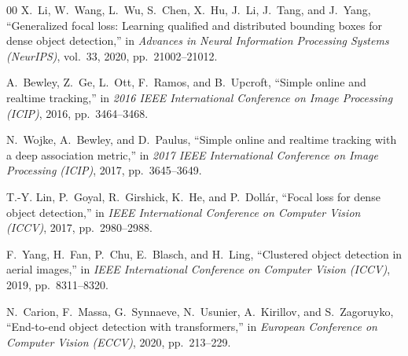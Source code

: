\documentclass[conference]{IEEEtran}
\begin{document}
\begin{thebibliography}{00}
X.~Li, W.~Wang, L.~Wu, S.~Chen, X.~Hu, J.~Li, J.~Tang, and J.~Yang, ``Generalized focal loss: Learning qualified and distributed bounding boxes for dense object detection,'' in \emph{Advances in Neural Information Processing Systems (NeurIPS)}, vol.~33, 2020, pp.~21002--21012.

A.~Bewley, Z.~Ge, L.~Ott, F.~Ramos, and B.~Upcroft, ``Simple online and realtime tracking,'' in \emph{2016 IEEE International Conference on Image Processing (ICIP)}, 2016, pp.~3464--3468.

N.~Wojke, A.~Bewley, and D.~Paulus, ``Simple online and realtime tracking with a deep association metric,'' in \emph{2017 IEEE International Conference on Image Processing (ICIP)}, 2017, pp.~3645--3649.

T.-Y. Lin, P.~Goyal, R.~Girshick, K.~He, and P.~Doll{\'a}r, ``Focal loss for dense object detection,'' in \emph{IEEE International Conference on Computer Vision (ICCV)}, 2017, pp.~2980--2988.

F.~Yang, H.~Fan, P.~Chu, E.~Blasch, and H.~Ling, ``Clustered object detection in aerial images,'' in \emph{IEEE International Conference on Computer Vision (ICCV)}, 2019, pp.~8311--8320.

N.~Carion, F.~Massa, G.~Synnaeve, N.~Usunier, A.~Kirillov, and S.~Zagoruyko, ``End-to-end object detection with transformers,'' in \emph{European Conference on Computer Vision (ECCV)}, 2020, pp.~213--229.

\end{thebibliography}
\end{document}
